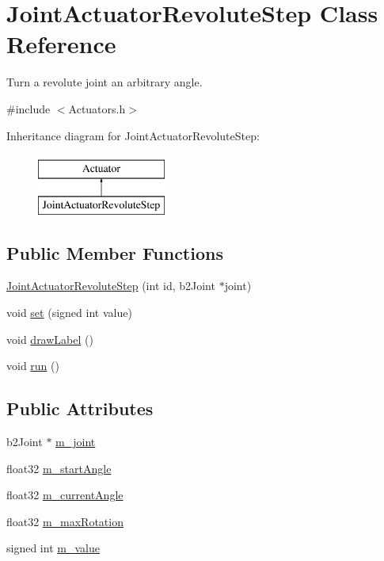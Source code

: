 \hypertarget{classJointActuatorRevoluteStep}{\section{Joint\-Actuator\-Revolute\-Step Class Reference}
\label{classJointActuatorRevoluteStep}
}


Turn a revolute joint an arbitrary angle.  




{\ttfamily \#include $<$Actuators.\-h$>$}

Inheritance diagram for Joint\-Actuator\-Revolute\-Step\-:\begin{figure}[H]
\begin{center}
\leavevmode
\includegraphics[height=2.000000cm]{classJointActuatorRevoluteStep}
\end{center}
\end{figure}
\subsection*{Public Member Functions}
\begin{DoxyCompactItemize}
\item 
\hyperlink{classJointActuatorRevoluteStep_a10d7586a8bfd9afdee5d1d32d2da4360}{Joint\-Actuator\-Revolute\-Step} (int id, b2\-Joint $\ast$joint)
\item 
void \hyperlink{classJointActuatorRevoluteStep_af72ade5873ae6b2816f1f7c89bf95971}{set} (signed int value)
\item 
void \hyperlink{classJointActuatorRevoluteStep_ab390783e9b495488afa09e8f29aee6d9}{draw\-Label} ()
\item 
void \hyperlink{classJointActuatorRevoluteStep_a6445fceda983f3fd1f0b280bb03a66af}{run} ()
\end{DoxyCompactItemize}
\subsection*{Public Attributes}
\begin{DoxyCompactItemize}
\item 
b2\-Joint $\ast$ \hyperlink{classJointActuatorRevoluteStep_a0b4484f5b13d01dcb0960cdd8f74cc0c}{m\-\_\-joint}
\item 
float32 \hyperlink{classJointActuatorRevoluteStep_aecca63a8d37534fcad4e12524a0c19a8}{m\-\_\-start\-Angle}
\item 
float32 \hyperlink{classJointActuatorRevoluteStep_a0df1b8e4adca3517b2a1aa3fa60c047c}{m\-\_\-current\-Angle}
\item 
float32 \hyperlink{classJointActuatorRevoluteStep_a708c8fd9fbc8ddf9eed1adf9029214b4}{m\-\_\-max\-Rotation}
\item 
signed int \hyperlink{classJointActuatorRevoluteStep_ae9c426c866c77fde187ee3cddb3a6ca4}{m\-\_\-value}
\end{DoxyCompactItemize}


